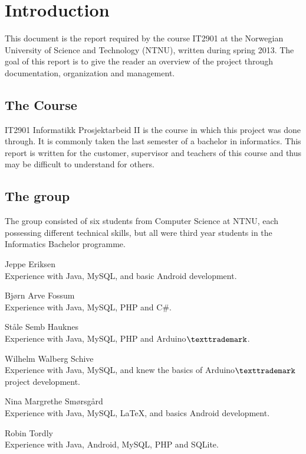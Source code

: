 \chapter{Introduction}

This document is the report required by the course IT2901 at the Norwegian University of Science and Technology (NTNU), written during spring 2013. The goal of this report is to give the reader an overview of the project through documentation, organization and management.

\section{The Course}
IT2901 Informatikk Prosjektarbeid II is the course in which this project was done through. It is commonly taken the last semester of a bachelor in informatics. This report is written for the customer, supervisor and teachers of this course and thus may be difficult to understand for others.

\section{The group}
The group consisted of six students from Computer Science at NTNU, each possessing different technical skills, but all were third year students in the Informatics Bachelor programme.

\begin{description}
	\item{Jeppe Eriksen}\hfill \\
		Experience with Java, MySQL, and basic Android development.
	\item{Bjørn Arve Fossum}\hfill \\
		Experience with Java, MySQL, PHP and C\#.
	\item{Ståle Semb Hauknes}\hfill \\
		Experience with Java, MySQL, PHP and Arduino$\texttrademark$.
	\item{Wilhelm Walberg Schive}\hfill \\
		Experience with Java, MySQL, and knew the basics of Arduino$\texttrademark$ project development.
	\item{Nina Margrethe Smørsgård}\hfill \\
		Experience with Java, MySQL, \LaTeX, and basics Android development.
	\item{Robin Tordly}\hfill \\
		Experience with Java, Android, MySQL, PHP and SQLite.
\end{description}

